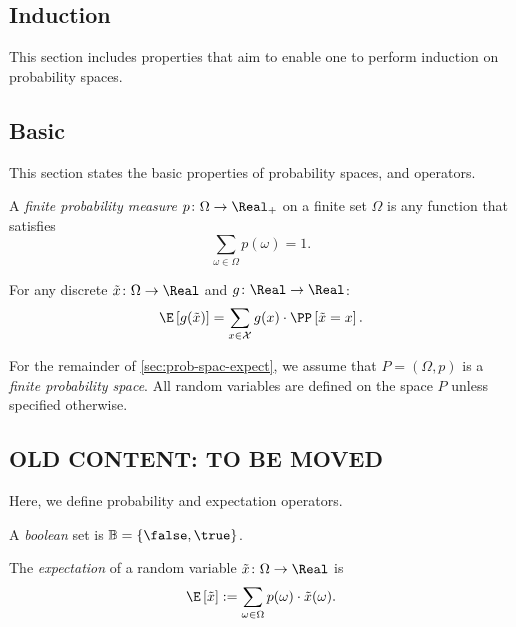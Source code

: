 \subsection{Induction}

This section includes properties that aim to enable one to perform induction on probability spaces. 

\subsection{Basic}

This section states the basic properties of probability spaces, and operators. 

\begin{definition} \label{def:probability-measure}
A \emph{finite probability measure} $p\colon \Omega \to \Real_+$ on a finite set $\Omega$ is any function that satisfies
\[
\sum_{\omega \in \Omega } p(\omega) = 1. 
\]
\end{definition}


\begin{theorem} \label{thm:unconscious}
  For any discrete $\tilde{x}\colon \Omega \to \Real$ and $g\colon \Real \to \Real$:
  \[
    \E\left[g(\tilde{x})\right] = \sum_{x\in \mathcal{X}} g(x) \cdot  \PP\left[\tilde{x} = x\right].
  \]
\end{theorem}


For the remainder of \cref{sec:prob-spac-expect}, we assume that $P = (\Omega, p)$ is a \emph{finite probability space}. All random variables are defined on the space $P$ unless specified otherwise.

\subsection{OLD CONTENT: TO BE MOVED}

Here, we define probability and expectation operators. 

\begin{definition}
A \emph{boolean} set is $\mathbb{B} = \left\{ \false, \true \right\}$.
\end{definition}

\begin{definition} \label{def:expect}
The \emph{expectation} of a random variable $\tilde{x} \colon \Omega \to \Real$ is 
\[
\E \left[ \tilde{x} \right] := \sum_{\omega \in \Omega } p(\omega ) \cdot \tilde{x}(\omega).
\]
\end{definition}

